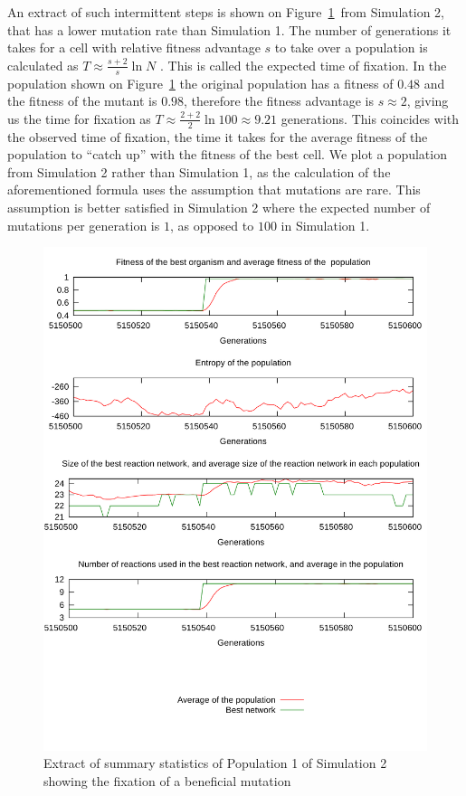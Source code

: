 \documentclass[a4paper,12pt]{article}
\begin{document}
An extract of such intermittent steps is shown on Figure~\ref{fig:fixation}~from Simulation 2, that has a lower mutation rate than Simulation 1. The number of generations it takes for a cell with relative fitness advantage $s$ to take over a population is calculated as $T \approx \frac{s+2}{s}\ln N$ \cite{barteklecture}. This is called the expected time of fixation. In the population shown on Figure~\ref{fig:fixation} the original population has a fitness of $0.48$ and the fitness of the mutant is $0.98$, therefore the fitness advantage is $s\approx2$, giving us the time for fixation as $T\approx \frac{2+2}{2}\ln 100 \approx 9.21$ generations. This coincides with the observed time of fixation, the time it takes for the average fitness of the population to ``catch up'' with the fitness of the best cell. We plot a population from Simulation 2 rather than Simulation 1, as the calculation of the aforementioned formula uses the assumption that mutations are rare. This assumption is better satisfied in Simulation 2 where the expected number of mutations per generation is $1$, as opposed to $100$ in Simulation 1.

\begin{figure}[htpb]
	\centering
	\includegraphics[width=0.8\linewidth]{fixation.pdf}
	\caption{Extract of summary statistics of Population 1 of Simulation 2 showing the fixation of a beneficial mutation}
	\label{fig:fixation}
\end{figure}
\end{document}
